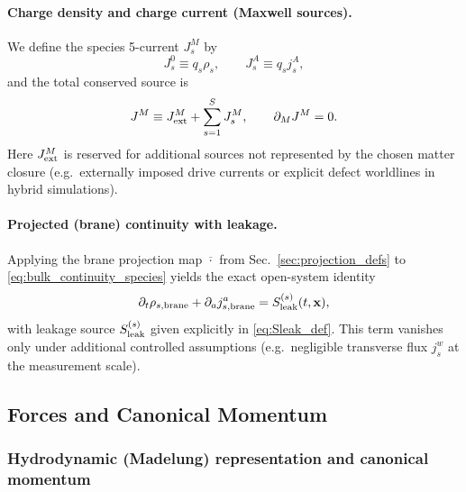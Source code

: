 \documentclass[11pt]{article}
\newcommand{\x}{\mathbf{x}}     %
\newcommand{\J}{J}              %
\newcommand{\Js}{J_s}           %
\newcommand{\Proj}[1]{\overline{#1}} %
\newcommand{\Sleak}{S_{\rm leak}}
\begin{document}
\paragraph{Charge density and charge current (Maxwell sources).}
We define the species 5-current \(\Js^M\) by
\begin{equation}
\Js^0 \equiv q_s\rho_s,
\qquad
\Js^A \equiv q_s j_s^A,
\label{eq:species_charge_current}
\end{equation}
and the total conserved source is
\begin{equation}
\J^M \equiv \J_{\rm ext}^M + \sum_{s=1}^S \Js^M,
\qquad
\partial_M \J^M = 0.
\label{eq:total_current_def}
\end{equation}
Here \(\J_{\rm ext}^M\) is reserved for additional sources not represented by the
chosen matter closure (e.g.\ externally imposed drive currents or explicit defect
worldlines in hybrid simulations).

\paragraph{Projected (brane) continuity with leakage.}
Applying the brane projection map \(\Proj{\cdot}\) from
Sec.~\ref{sec:projection_defs} to \eqref{eq:bulk_continuity_species} yields the exact
open-system identity
\begin{equation}
\partial_t \rho_{s,\rm brane} + \partial_a j_{s,\rm brane}^a = \Sleak^{(s)}(t,\x),
\label{eq:projected_continuity_species_repeat}
\end{equation}
with leakage source \(\Sleak^{(s)}\) given explicitly in
\eqref{eq:Sleak_def}. This term vanishes only under additional controlled
assumptions (e.g.\ negligible transverse flux \(j_s^w\) at the measurement scale).

\subsection{Forces and Canonical Momentum}
\label{sec:canonical_momentum}

\subsubsection*{Hydrodynamic (Madelung) representation and canonical momentum}
\end{document}
